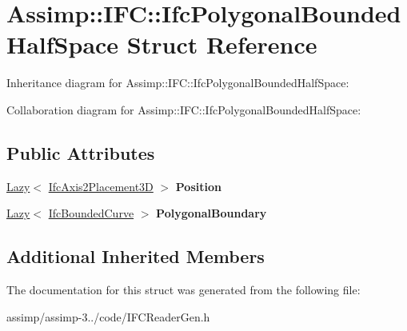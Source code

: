 \hypertarget{struct_assimp_1_1_i_f_c_1_1_ifc_polygonal_bounded_half_space}{\section{Assimp\+:\+:I\+F\+C\+:\+:Ifc\+Polygonal\+Bounded\+Half\+Space Struct Reference}
\label{struct_assimp_1_1_i_f_c_1_1_ifc_polygonal_bounded_half_space}
}


Inheritance diagram for Assimp\+:\+:I\+F\+C\+:\+:Ifc\+Polygonal\+Bounded\+Half\+Space\+:


Collaboration diagram for Assimp\+:\+:I\+F\+C\+:\+:Ifc\+Polygonal\+Bounded\+Half\+Space\+:
\subsection*{Public Attributes}
\begin{DoxyCompactItemize}
\item 
\hypertarget{struct_assimp_1_1_i_f_c_1_1_ifc_polygonal_bounded_half_space_a81db1465a7f683c78d7ddc4118f8f3a2}{\hyperlink{struct_assimp_1_1_s_t_e_p_1_1_lazy}{Lazy}$<$ \hyperlink{struct_assimp_1_1_i_f_c_1_1_ifc_axis2_placement3_d}{Ifc\+Axis2\+Placement3\+D} $>$ {\bfseries Position}}\label{struct_assimp_1_1_i_f_c_1_1_ifc_polygonal_bounded_half_space_a81db1465a7f683c78d7ddc4118f8f3a2}

\item 
\hypertarget{struct_assimp_1_1_i_f_c_1_1_ifc_polygonal_bounded_half_space_a378eb9067ee5d97895f4880595b905f3}{\hyperlink{struct_assimp_1_1_s_t_e_p_1_1_lazy}{Lazy}$<$ \hyperlink{struct_assimp_1_1_i_f_c_1_1_ifc_bounded_curve}{Ifc\+Bounded\+Curve} $>$ {\bfseries Polygonal\+Boundary}}\label{struct_assimp_1_1_i_f_c_1_1_ifc_polygonal_bounded_half_space_a378eb9067ee5d97895f4880595b905f3}

\end{DoxyCompactItemize}
\subsection*{Additional Inherited Members}


The documentation for this struct was generated from the following file\+:\begin{DoxyCompactItemize}
\item 
assimp/assimp-\/3../code/I\+F\+C\+Reader\+Gen.\+h\end{DoxyCompactItemize}
